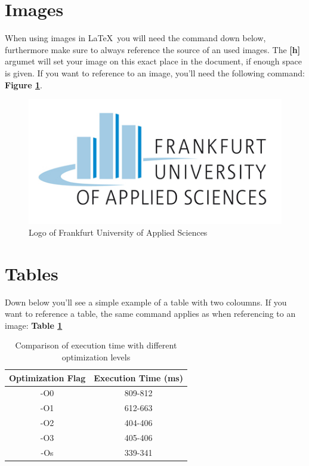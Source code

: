 \documentclass[]{article}
\begin{document}
\section{Images}
When using images in \LaTeX\ you will need the command down below, furthermore make sure to always reference the source of an used images. The \textbf{[h]} argumet will set your image on this exact place in the document, if enough space is given. If you want to reference to an image, you'll need the following command: \textbf{Figure \ref{img:fra_logo}}.
	\begin{figure}[h]
		\centering
		\includegraphics[scale=0.40]{images/logo}
		\caption{Logo of Frankfurt University of Applied Sciences}
		\label{img:fra_logo}
	\end{figure}

\section{Tables}
Down below you'll see a simple example of a table with two coloumns. If you want to reference a table, the same command applies as when referencing to an image: \textbf{Table \ref{img:fra_logo}}  
	
\begin{table}[h!]
	\centering
	\begin{tabular}{|c|c|}
		\hline
		{\textbf{Optimization Flag}}	&		{\textbf{Execution Time (ms)}} \\
		\hline
		-O0							&		809-812								\\
		\hline
		-O1							&		612-663								\\
		\hline
		-O2							&		404-406								\\
		\hline
		-O3							&		405-406								\\
		\hline
		-Os							&		339-341								\\
		\hline
	\end{tabular}
	\caption{Comparison of execution time with different optimization levels}
	\label{tab:exc_time}
\end{table}
\end{document}
